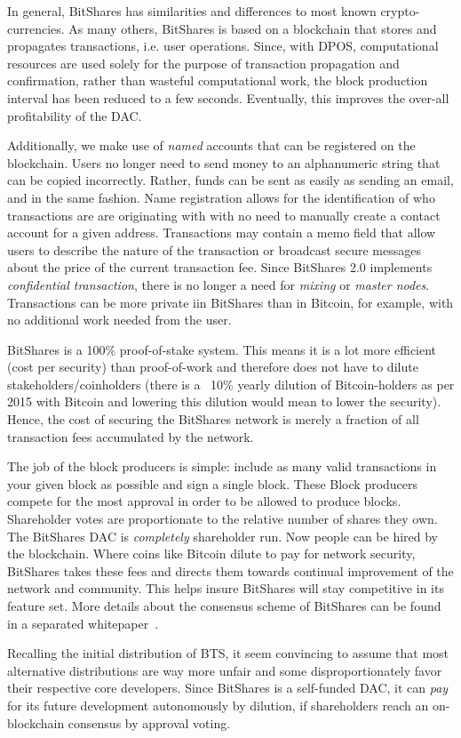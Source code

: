 In general, BitShares has similarities and differences to most known
crypto-currencies. As many others, BitShares is based on a blockchain that
stores and propagates transactions, i.e. user operations. Since, with DPOS,
computational resources are used solely for the purpose of transaction
propagation and confirmation, rather than wasteful computational work, the
block production interval has been reduced to a few seconds. Eventually, this
improves the over-all profitability of the DAC.

Additionally, we make use of \emph{named} accounts that can be registered on
the blockchain. Users no longer need to send money to an alphanumeric string
that can be copied incorrectly. Rather, funds can be sent as easily as sending
an email, and in the same fashion. Name registration allows for the
identification of who transactions are are originating with with no need to
manually create a contact account for a given address. Transactions may contain
a memo field that allow users to describe the nature of the transaction or
broadcast secure messages about the price of the current transaction fee. Since
BitShares 2.0 implements \emph{confidential transaction}, there is no longer a
need for \emph{mixing} or \emph{master nodes}. Transactions can be more private
iin BitShares than in Bitcoin, for example, with no additional work needed from
the user.

BitShares is a 100\% proof-of-stake system. This means it is a lot more
efficient (cost per security) than proof-of-work and therefore does not have to
dilute stakeholders/coinholders (there is a ~10\% yearly dilution of
Bitcoin-holders as per 2015 with Bitcoin and lowering this dilution would mean
to lower the security). Hence, the cost of securing the BitShares network is
merely a fraction of all transaction fees accumulated by the network. 

The job of the block producers is simple: include as many valid transactions in
your given block as possible and sign a single block. These Block producers
compete for the most approval in order to be allowed to produce blocks.
Shareholder votes are proportionate to the relative number of shares they own.
The BitShares DAC is \emph{completely} shareholder run. Now people can be hired
by the blockchain. Where coins like Bitcoin dilute to pay for network security,
BitShares takes these fees and directs them towards continual improvement of
the network and community. This helps insure BitShares will stay competitive in
its feature set. More details about the consensus scheme of BitShares can be
found in a separated whitepaper~\cite{}.

Recalling the initial distribution of BTS, it seem convincing to assume that
most alternative distributions are way more unfair and some disproportionately
favor their respective core developers. Since BitShares is a self-funded DAC,
it can \emph{pay} for its future development autonomously by dilution, if
shareholders reach an on-blockchain consensus by approval voting.

